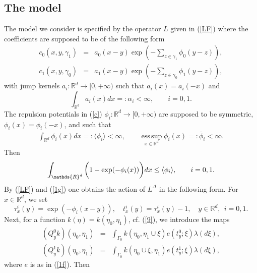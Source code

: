 \documentclass[reqno,11pt]{amsart}
\theoremstyle{definition}
\theoremstyle{remark}
\numberwithin{equation}{section}
\begin{document}
\subsection{The model}

The model we consider is specified by the operator $L$ given in
(\ref{LF}) where the coefficients are supposed to be of the
following form
\begin{eqnarray}\label{c}
c_{0}(x,y,\gamma_{1}) & = & a_{0}(x-y)\exp\left(-\sum_{z \in \gamma_{1}}\phi_{0}(y-z)\right),\\[.2cm]
c_{1}(x,y,\gamma_{0}) & = & a_{1}(x-y)\exp\left(-\sum_{z \in \gamma_{0}}\phi_{1}(y-z)\right), \nonumber
\end{eqnarray}
with jump kernels $a_{i}: \mathds{R}^d \rightarrow [0,+\infty)$ such
that $a_{i}(x)=a_{i}(-x)$ and
\begin{equation}
 \label{10}
\int_{\mathds{R}^d}a_{i}(x)d x =: \alpha_i < \infty, \qquad i=0,1.
\end{equation}
The repulsion potentials in (\ref{c}) $\phi_{i}: \mathds{R}^d
\rightarrow [0,+\infty)$ are supposed to be symmetric, $\phi_i(x) =
\phi_i(-x)$, and such that
\begin{eqnarray}
  \label{33}
\int_{\mathds{R}^d} \phi_i(x) d x =:\langle \phi_i \rangle < \infty,
\qquad \operatorname*{\mathrm{ess\,sup}}_{x\in \mathds{R}^d} \phi_i (x) =:\bar{\phi}_i <
\infty.
\end{eqnarray}
Then
\begin{equation}
 \label{11}
 \int_{\mathds{R}^d}\bigg{(}1-\exp(-\phi_{i}(x))\bigg{)}d x \leq \langle \phi_{i} \rangle, \qquad i=0,1.
\end{equation}
By (\ref{LF}) and (\ref{1g}) one obtains the action of $L^\Delta$ in
the following form. For $x\in \mathds{R}^d$, we set
\begin{equation}
  \label{12}
 \tau_x^i (y) = \exp(-\phi_i (x-y)), \quad  t_x^i (y)= \tau_x^i (y) - 1, \quad
 y\in \mathds{R}^d, \ \ i=0,1.
\end{equation}
Next, for a function $k(\eta) = k(\eta_0, \eta_1)$, cf. (\ref{9}),
we introduce the maps
\begin{eqnarray}
  \label{13}
(Q_y^0 k) (\eta_0, \eta_1) & = & \int_{\Gamma_0} k(\eta_0, \eta_1
\cup \xi)e(t^0_y ;\xi) \lambda(d\xi), \\[.2cm]
(Q_y^1 k) (\eta_0, \eta_1) & = & \int_{\Gamma_0} k(\eta_0\cup \xi,
\eta_1 )e(t^1_y ;\xi) \lambda(d\xi), \nonumber
\end{eqnarray}
where $e$ is as in (\ref{1f}). Then
\end{document}
